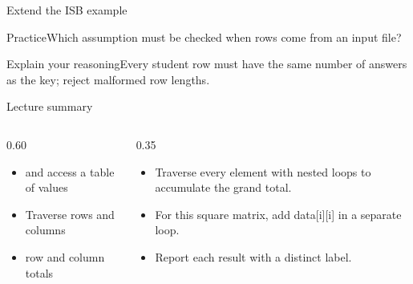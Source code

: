 \documentclass[10pt,aspectratio=169]{beamer}
\begin{document}
\begin{frame}[fragile,t]{Extend the ISB example}
\begin{alertblock}{Practice}Which assumption must be checked when rows come from an input file?\end{alertblock}\vspace{3mm}\begin{exampleblock}{Explain your reasoning}Every student row must have the same number of answers as the key; reject malformed row lengths.\end{exampleblock}
\end{frame}
\begin{frame}[fragile,t]{Lecture summary}
\begin{columns}[T,onlytextwidth]\begin{column}{0.60\textwidth}
\begin{itemize}
\item and access a table of values
\item Traverse rows and columns
\item row and column totals
\end{itemize}
\end{column}\begin{column}{0.35\textwidth}\small
\begin{itemize}
\item Traverse every element with nested loops to accumulate the grand total.
\item For this square matrix, add data[i][i] in a separate loop.
\item Report each result with a distinct label.
\end{itemize}
\end{column}\end{columns}
\end{frame}
\end{document}

